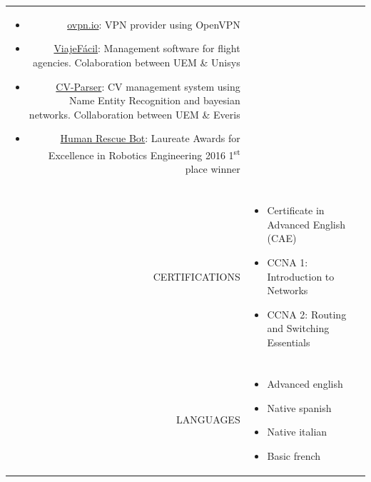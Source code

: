 \documentclass[a4paper, 11pt]{article}
\begin{document}
\begin{longtable}{rp{11cm}}
\begin{itemize}[leftmargin=0cm,label={}]
            \item \href{https://ovpn.io}{ovpn.io}: VPN provider using OpenVPN
            \item \href{https://github.com/hugo19941994/ViajeFacil}{ViajeFácil}: Management software for flight agencies. Colaboration between UEM \& Unisys
            \item \href{https://github.com/hugo19941994/CV-Parser}{CV-Parser}: CV management system using Name Entity Recognition and bayesian networks. Collaboration between UEM \& Everis
            \item \href{https://github.com/hugo19941994/robot}{Human Rescue Bot}: Laureate Awards for Excellence in Robotics Engineering 2016 1\textsuperscript{st} place winner
        \end{itemize}\\
        \\
        CERTIFICATIONS
        & \vspace{-8mm}
        \begin{itemize}[leftmargin=0cm,label={},noitemsep]
            \item Certificate in Advanced English (CAE)
            \item CCNA 1: Introduction to Networks
            \item CCNA 2: Routing and Switching Essentials
        \end{itemize}\\
        \\
        LANGUAGES
        & \vspace{-8mm}
        \begin{itemize}[leftmargin=0cm,label={},noitemsep]
            \item Advanced english
            \item Native spanish
            \item Native italian
            \item Basic french
        \end{itemize}
    \end{longtable}
\end{document}
